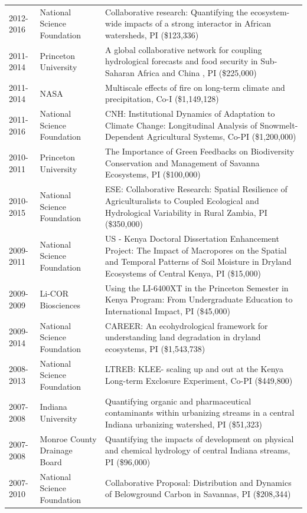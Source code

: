 \begin{longtable}{p{1.75cm}>{\raggedright}p{}p{12cm}}
2012-2016 & National Science Foundation & Collaborative research: Quantifying the ecosystem-wide impacts of a strong interactor in African watersheds, PI (\$123,336) \\ 
2011-2014 & Princeton University & A global collaborative network for coupling hydrological forecasts and food security in Sub-Saharan Africa and China , PI (\$225,000) \\ 
2011-2014 & NASA & Multiscale effects of fire on long-term climate and precipitation, Co-I (\$1,149,128) \\ 
2011-2016 & National Science Foundation & CNH: Institutional Dynamics of Adaptation to Climate Change: Longitudinal Analysis of Snowmelt-Dependent Agricultural Systems, Co-PI (\$1,200,000) \\ 
2010-2011 & Princeton University & The Importance of Green Feedbacks on Biodiversity Conservation and Management of Savanna Ecosystems, PI (\$100,000) \\ 
2010-2015 & National Science Foundation & ESE: Collaborative Research: Spatial Resilience of Agriculturalists to Coupled Ecological and Hydrological Variability in Rural Zambia, PI (\$350,000) \\ 
2009-2011 & National Science Foundation & US - Kenya Doctoral Dissertation Enhancement Project: The Impact of Macropores on the Spatial and Temporal Patterns of Soil Moisture in Dryland Ecosystems of Central Kenya, PI (\$15,000) \\ 
2009-2009 & Li-COR Biosciences & Using the LI-6400XT in the Princeton Semester in Kenya Program: From Undergraduate Education to International Impact, PI (\$45,000) \\ 
2009-2014 & National Science Foundation & CAREER: An ecohydrological framework for understanding land degradation in dryland ecosystems, PI (\$1,543,738) \\ 
2008-2013 & National Science Foundation & LTREB: KLEE- scaling up and out at the Kenya Long-term Exclosure Experiment, Co-PI (\$449,800) \\ 
2007-2008 & Indiana University & Quantifying organic and pharmaceutical contaminants within urbanizing streams in a central Indiana urbanizing watershed, PI (\$51,323) \\ 
2007-2008 & Monroe County Drainage Board & Quantifying the impacts of development on physical and chemical hydrology of central Indiana streams, PI (\$96,000) \\ 
2007-2010 & National Science Foundation & Collaborative Proposal: Distribution and Dynamics of Belowground Carbon in Savannas, PI (\$208,344) \\ 

\end{longtable}
